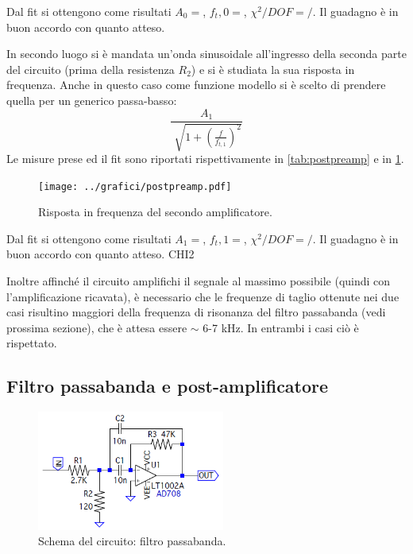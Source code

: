 \documentclass[a4paper,10pt]{article}
\begin{document}
Dal fit si ottengono come risultati $A_0 = $, $f_t,0 = $, $\chi^2/DOF = /$. Il guadagno è in buon accordo con quanto atteso. 

In secondo luogo si è mandata un'onda sinusoidale all'ingresso della seconda parte del circuito (prima della resistenza $R_2$) e si è studiata la sua risposta in frequenza.
Anche in questo caso come funzione modello si è scelto di prendere quella per un generico passa-basso:
\vspace*{-5pt}
\begin{equation}
\frac{A_1}{\sqrt[]{1+(\frac{f}{f_{t,1}})^2}}
\end{equation}
\vspace*{-5pt}
 Le misure prese ed il fit sono riportati rispettivamente in \cref{tab:postpreamp} e in \cref{fig:postpreamp}.

\vspace*{-5pt}
\begin{figure}[H]
	\centering
	\texttt{[image: ../grafici/postpreamp.pdf]}
	\vspace*{-10pt}
	\caption{Risposta in frequenza del secondo amplificatore.}
	\label{fig:postpreamp}
\end{figure}
\vspace*{-10pt}

Dal fit si ottengono come risultati $A_1 = $, $f_t,1 = $, $\chi^2/DOF = /$. Il guadagno è in buon accordo con quanto atteso. 
CHI2

Inoltre affinché il circuito amplifichi il segnale al massimo possibile (quindi con l'amplificazione ricavata), è necessario che le frequenze di taglio ottenute nei due casi risultino maggiori della frequenza di risonanza del filtro passabanda (vedi prossima sezione), che è attesa essere $\sim$ 6-7 kHz. In entrambi i casi ciò è rispettato.

\subsection{Filtro passabanda e post-amplificatore}

\begin{figure}
	\vspace{-10pt}
	\centering
	\includegraphics[width=0.55\textwidth]{../grafici/Bandpass.png}
	\vspace{-12pt}
	\caption{Schema del circuito: filtro passabanda.}
	\label{fig:bandpass}
	\vspace{-6pt}
\end{figure}
\end{document}
